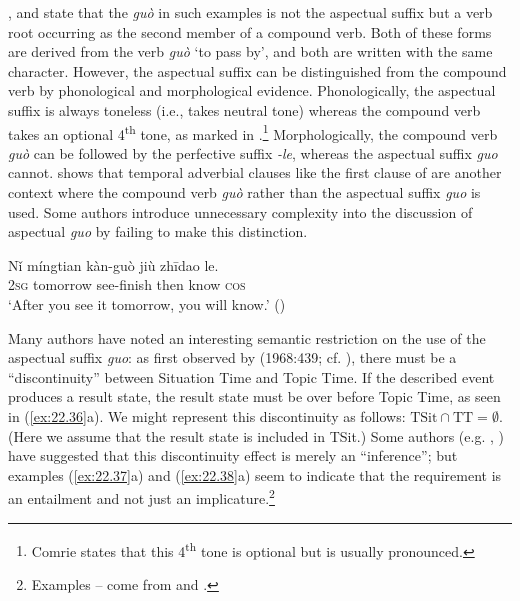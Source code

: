 \citet[251]{Chao1968}, \citet[59]{Comrie1976} and \citet[139ff.]{XiaoMcEnery2004} state that the \textit{guò} in such examples is not the aspectual suffix but a verb root occurring as the second member of a compound verb. Both of these forms are derived from the verb \textit{guò} ‘to pass by’, and both are written with the same  character. However, the aspectual suffix can be distinguished from the compound verb by phonological and morphological evidence. Phonologically, the aspectual suffix is always toneless (i.e., takes neutral tone) whereas the compound verb takes an optional 4\textsuperscript{th} tone, as marked in .\footnote{Comrie states that this 4\textsuperscript{th} tone is optional but is usually pronounced.} Morphologically, the compound verb \textit{guò} can be followed by the perfective suffix \textit{-le}, whereas the aspectual suffix \textit{guo} cannot. \citet[39--40]{Chu1998} shows that temporal adverbial clauses like the first clause of  are another context where the compound verb \textit{guò} rather than the aspectual suffix \textit{guo} is used. Some authors introduce unnecessary complexity into the discussion of aspectual \textit{guo} by failing to make this distinction.


\ea \label{ex:22.35}
\gll Nǐ  míngtian  kàn-guò  jiù  zhīdao  le.\\
\textsc{2sg}  tomorrow  see-finish  then  know  \textsc{cos}\\
\glt ‘After you see it tomorrow, you will know.’  (\citealt{Chen1979})
\z


Many authors have noted an interesting semantic restriction on the use of the aspectual suffix \textit{guo}: as first observed by \citeauthor{Chao1968} (1968:439; cf. \citealt{Yeh1996}), there must be a “discontinuity” between Situation Time and Topic Time. If the described event produces a result state, the result state must be over before Topic Time, as seen in (\ref{ex:22.36}a). We might represent this discontinuity as follows: $\text{TSit} \cap \text{TT} = \emptyset$. (Here we assume that the result state is included in TSit.) Some authors (e.g. \citealt{Iljic1990}, \citealt{Yeh1996}) have suggested that this discontinuity effect is merely an “inference”; but examples (\ref{ex:22.37}a) and (\ref{ex:22.38}a) seem to indicate that the requirement is an entailment and not just an implicature.\footnote{Examples -- come from \citet[18, 25]{Ma1977} and \citet{Chao1968}.}


